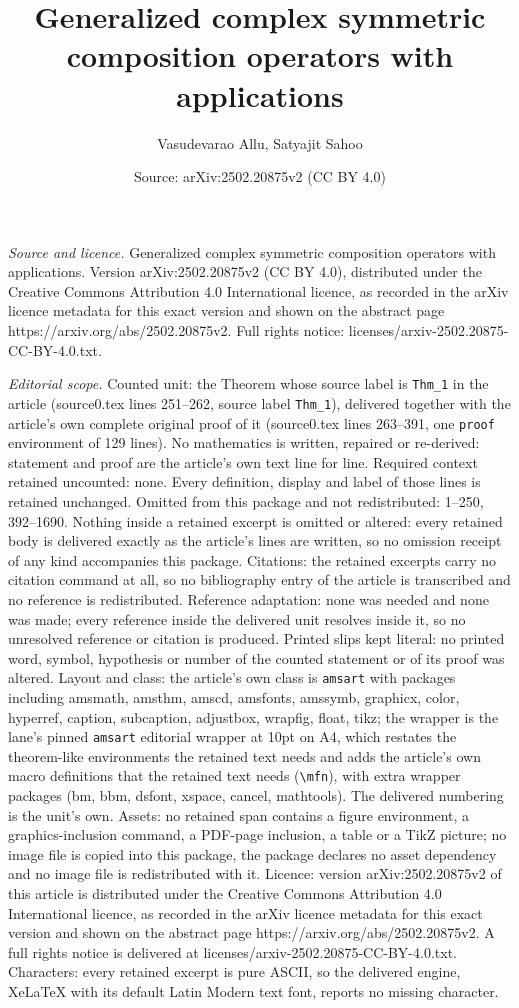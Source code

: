 \documentclass[10pt,a4paper]{amsart}
\title[Generalized complex symmetric composition operators with app]{Generalized complex symmetric composition operators with applications}
\author{Vasudevarao Allu, Satyajit Sahoo}
\date{Source: arXiv:2502.20875v2 (CC BY 4.0)}
\begin{document}
\maketitle

\noindent\emph{Source and licence.} Generalized complex symmetric composition operators with applications. Version arXiv:2502.20875v2 (CC BY 4.0), distributed under the Creative Commons Attribution 4.0 International licence, as recorded in the arXiv licence metadata for this exact version and shown on the abstract page https://arxiv.org/abs/2502.20875v2. Full rights notice: licenses/arxiv-2502.20875-CC-BY-4.0.txt.\par\smallskip

\noindent\textit{Editorial scope.} Counted unit: the Theorem whose source label is \texttt{Thm\_1} in the article (source0.tex lines 251--262, source label \texttt{Thm\_1}), delivered together with the article's own complete original proof of it (source0.tex lines 263--391, one \texttt{proof} environment of 129 lines). No mathematics is written, repaired or re-derived: statement and proof are the article's own text line for line. Required context retained uncounted: none. Every definition, display and label of those lines is retained unchanged. Omitted from this package and not redistributed: 1--250, 392--1690. Nothing inside a retained excerpt is omitted or altered: every retained body is delivered exactly as the article's lines are written, so no omission receipt of any kind accompanies this package. Citations: the retained excerpts carry no citation command at all, so no bibliography entry of the article is transcribed and no reference is redistributed. Reference adaptation: none was needed and none was made; every reference inside the delivered unit resolves inside it, so no unresolved reference or citation is produced. Printed slips kept literal: no printed word, symbol, hypothesis or number of the counted statement or of its proof was altered. Layout and class: the article's own class is \texttt{amsart} with packages including amsmath, amsthm, amscd, amsfonts, amssymb, graphicx, color, hyperref, caption, subcaption, adjustbox, wrapfig, float, tikz; the wrapper is the lane's pinned \texttt{amsart} editorial wrapper at 10pt on A4, which restates the theorem-like environments the retained text needs and adds the article's own macro definitions that the retained text needs (\texttt{\textbackslash mfn}), with extra wrapper packages (bm, bbm, dsfont, xspace, cancel, mathtools). The delivered numbering is the unit's own. Assets: no retained span contains a figure environment, a graphics-inclusion command, a PDF-page inclusion, a table or a TikZ picture; no image file is copied into this package, the package declares no asset dependency and no image file is redistributed with it. Licence: version arXiv:2502.20875v2 of this article is distributed under the Creative Commons Attribution 4.0 International licence, as recorded in the arXiv licence metadata for this exact version and shown on the abstract page https://arxiv.org/abs/2502.20875v2. A full rights notice is delivered at licenses/arxiv-2502.20875-CC-BY-4.0.txt. Characters: every retained excerpt is pure ASCII, so the delivered engine, XeLaTeX with its default Latin Modern text font, reports no missing character.
\end{document}
